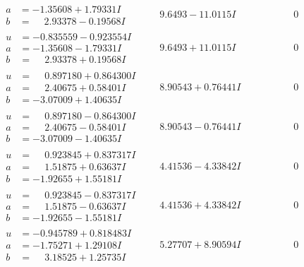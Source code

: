 \documentclass[1p]{elsarticle_modified}
\theoremstyle{definition}
\begin{document}
$$\begin{array}{c|c|c}
\begin{aligned}
a &= -1.35608 + 1.79331 I \\
b &= \phantom{-}2.93378 - 0.19568 I\end{aligned}
 & \phantom{-}9.6493 - 11.0115 I & \phantom{-0.000000 } 0 \\ \hline\begin{aligned}
u &= -0.835559 - 0.923554 I \\
a &= -1.35608 - 1.79331 I \\
b &= \phantom{-}2.93378 + 0.19568 I\end{aligned}
 & \phantom{-}9.6493 + 11.0115 I & \phantom{-0.000000 } 0 \\ \hline\begin{aligned}
u &= \phantom{-}0.897180 + 0.864300 I \\
a &= \phantom{-}2.40675 + 0.58401 I \\
b &= -3.07009 + 1.40635 I\end{aligned}
 & \phantom{-}8.90543 + 0.76441 I & \phantom{-0.000000 } 0 \\ \hline\begin{aligned}
u &= \phantom{-}0.897180 - 0.864300 I \\
a &= \phantom{-}2.40675 - 0.58401 I \\
b &= -3.07009 - 1.40635 I\end{aligned}
 & \phantom{-}8.90543 - 0.76441 I & \phantom{-0.000000 } 0 \\ \hline\begin{aligned}
u &= \phantom{-}0.923845 + 0.837317 I \\
a &= \phantom{-}1.51875 + 0.63637 I \\
b &= -1.92655 + 1.55181 I\end{aligned}
 & \phantom{-}4.41536 - 4.33842 I & \phantom{-0.000000 } 0 \\ \hline\begin{aligned}
u &= \phantom{-}0.923845 - 0.837317 I \\
a &= \phantom{-}1.51875 - 0.63637 I \\
b &= -1.92655 - 1.55181 I\end{aligned}
 & \phantom{-}4.41536 + 4.33842 I & \phantom{-0.000000 } 0 \\ \hline\begin{aligned}
u &= -0.945789 + 0.818483 I \\
a &= -1.75271 + 1.29108 I \\
b &= \phantom{-}3.18525 + 1.25735 I\end{aligned}
 & \phantom{-}5.27707 + 8.90594 I & \phantom{-0.000000 } 0 \\ \hline\begin{aligned}

\end{aligned}
\end{array}$$
\end{document}
